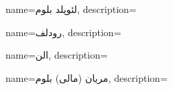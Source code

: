 {
name={لئوپلد بلوم},
description={}
}

{
name={رودلف},
description={}
}

{
name={الن},
description={}
}

{
name={مریان (مالی) بلوم},
description={}
}